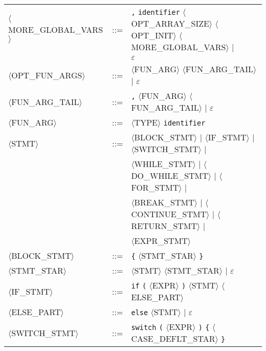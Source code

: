 \begin{footnotesize}
\begin{longtable}{>{\raggedright\arraybackslash}p{4cm}@{\ }>{\raggedright\arraybackslash}p{1.5cm}@{\ }>{\raggedright\arraybackslash}p{8.5cm}}
      $\langle$MORE\_GLOBAL\_VARS$\rangle$ & ::= & \texttt{,} \texttt{identifier} $\langle$OPT\_ARRAY\_SIZE$\rangle$ $\langle$OPT\_INIT$\rangle$ $\langle$MORE\_GLOBAL\_VARS$\rangle$ $\mid$ \\
      & & $\varepsilon$ \\
      
      $\langle$OPT\_FUN\_ARGS$\rangle$ & ::= & $\langle$FUN\_ARG$\rangle$ $\langle$FUN\_ARG\_TAIL$\rangle$ $\mid$ $\varepsilon$ \\
      
      $\langle$FUN\_ARG\_TAIL$\rangle$ & ::= & \texttt{,} $\langle$FUN\_ARG$\rangle$ $\langle$FUN\_ARG\_TAIL$\rangle$ $\mid$ $\varepsilon$ \\
      
      $\langle$FUN\_ARG$\rangle$ & ::= & $\langle$TYPE$\rangle$ \texttt{identifier} \\
      
      $\langle$STMT$\rangle$ & ::= & $\langle$BLOCK\_STMT$\rangle$ $\mid$ $\langle$IF\_STMT$\rangle$ $\mid$ $\langle$SWITCH\_STMT$\rangle$ $\mid$ \\
      & & $\langle$WHILE\_STMT$\rangle$ $\mid$ $\langle$DO\_WHILE\_STMT$\rangle$ $\mid$ $\langle$FOR\_STMT$\rangle$ $\mid$ \\
      & & $\langle$BREAK\_STMT$\rangle$ $\mid$ $\langle$CONTINUE\_STMT$\rangle$ $\mid$ $\langle$RETURN\_STMT$\rangle$ $\mid$ \\
      & & $\langle$EXPR\_STMT$\rangle$ \\
      
      $\langle$BLOCK\_STMT$\rangle$ & ::= & \texttt{\{} $\langle$STMT\_STAR$\rangle$ \texttt{\}} \\
      
      $\langle$STMT\_STAR$\rangle$ & ::= & $\langle$STMT$\rangle$ $\langle$STMT\_STAR$\rangle$ $\mid$ $\varepsilon$ \\
      
      $\langle$IF\_STMT$\rangle$ & ::= & \texttt{if} \texttt{(} $\langle$EXPR$\rangle$ \texttt{)} $\langle$STMT$\rangle$ $\langle$ELSE\_PART$\rangle$ \\
      
      $\langle$ELSE\_PART$\rangle$ & ::= & \texttt{else} $\langle$STMT$\rangle$ $\mid$ $\varepsilon$ \\
      
      $\langle$SWITCH\_STMT$\rangle$ & ::= & \texttt{switch} \texttt{(} $\langle$EXPR$\rangle$ \texttt{)} \texttt{\{} $\langle$CASE\_DEFLT\_STAR$\rangle$ \texttt{\}} \\
      

\end{longtable}
\end{footnotesize}
